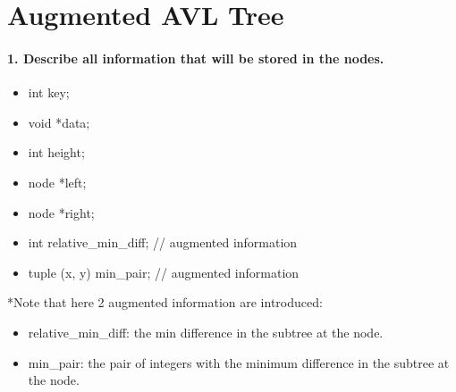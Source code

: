 \documentclass{article}
\begin{document}

\section*{Augmented AVL Tree}
\paragraph*{1. Describe all information that will be stored in the nodes.}
\begin{itemize}
    \item int key;
    \item void *data;
    \item int height;
    \item node *left;
    \item node *right;
    \item int relative\_min\_diff; // augmented information
    \item tuple (x, y) min\_pair; // augmented information
\end{itemize}

*Note that here 2 augmented information are introduced:

\begin{itemize}
    \item relative\_min\_diff: the min difference in the subtree at the node.
    \item min\_pair: the pair of integers with the minimum difference in the subtree at the node.
\end{itemize}

\newpage
\end{document}
